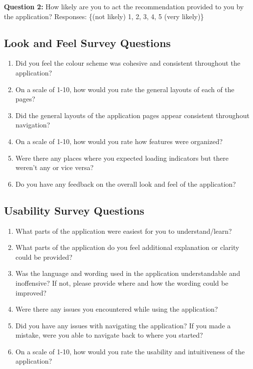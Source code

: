 \documentclass[12pt, titlepage]{article}
\begin{document}
\noindent \textbf{Question 2:} How likely are you to act the recommendation provided to you by the application?
Responses: \{(not likely) 1, 2, 3, 4, 5 (very likely)\}

\subsection{Look and Feel Survey Questions}

\begin{enumerate}
  \item Did you feel the colour scheme was cohesive and consistent throughout the application?
  \item On a scale of 1-10, how would you rate the general layouts of each of the pages?
  \item Did the general layouts of the application pages appear consistent throughout navigation?
  \item On a scale of 1-10, how would you rate how features were organized?
  \item Were there any places where you expected loading indicators but there weren't any or vice versa?
  \item Do you have any feedback on the overall look and feel of the application?
\end{enumerate}

\subsection{Usability Survey Questions}

\begin{enumerate}
  \item What parts of the application were easiest for you to understand/learn?
  \item What parts of the application do you feel additional explanation or clarity could be provided?
  \item Was the language and wording used in the application understandable and inoffensive? If not, please
  provide where and how the wording could be improved?
  \item Were there any issues you encountered while using the application?
  \item Did you have any issues with navigating the application? If you made a mistake, were you able to navigate
  back to where you started?
  \item On a scale of 1-10, how would you rate the usability and intuitiveness of the application?
\end{enumerate}
\end{document}

